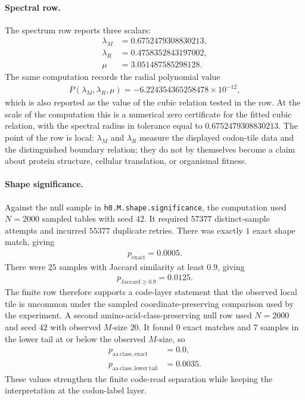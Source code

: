 \paragraph{Spectral row.}
The spectrum row reports three scalars:
$$
\begin{aligned}
\lambda_M&=0.6752479308830213,\\
\lambda_R&=0.4758352843197002,\\
\mu&=3.051487585298128.
\end{aligned}
$$
The same computation records the radial polynomial value
$$
\begin{aligned}
P(\lambda_M,\lambda_R,\mu)=-6.224354365258478\times 10^{-12},
\end{aligned}
$$
which is also reported as the value of the cubic relation tested in the row. At the scale of the computation this is a numerical zero certificate for the fitted cubic relation, with the spectral radius in tolerance equal to $0.6752479308830213$. The point of the row is local: $\lambda_M$ and $\lambda_R$ measure the displayed codon-tile data and the distinguished boundary relation; they do not by themselves become a claim about protein structure, cellular translation, or organismal fitness.

\paragraph{Shape significance.}
Against the null sample in \texttt{h0.M.shape.significance}, the computation used $N=2000$ sampled tables with seed $42$. It required $57377$ distinct-sample attempts and incurred $55377$ duplicate retries. There was exactly $1$ exact shape match, giving
$$
\begin{aligned}
p_{\mathrm{exact}}=0.0005.
\end{aligned}
$$
There were $25$ samples with Jaccard similarity at least $0.9$, giving
$$
\begin{aligned}
p_{\mathrm{Jaccard}\geq 0.9}=0.0125.
\end{aligned}
$$
The finite row therefore supports a code-layer statement that the observed local tile is uncommon under the sampled coordinate-preserving comparison used by the experiment. A second amino-acid-class-preserving null row used $N=2000$ and seed $42$ with observed $M$-size $20$. It found $0$ exact matches and $7$ samples in the lower tail at or below the observed $M$-size, so
$$
\begin{aligned}
p_{\mathrm{aa\ class,exact}}&=0.0,\\
p_{\mathrm{aa\ class,lower\ tail}}&=0.0035.
\end{aligned}
$$
These values strengthen the finite code-read separation while keeping the interpretation at the codon-label layer.

